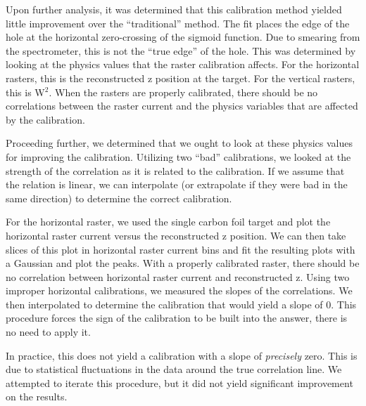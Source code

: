 Upon further analysis, it was determined that this calibration method yielded little improvement over the ``traditional'' method. The fit places the edge of the hole at the horizontal zero-crossing of the sigmoid function. Due to smearing from the spectrometer, this is not the ``true edge'' of the hole. This was determined by looking at the physics values that the raster calibration affects. For the horizontal rasters, this is the reconstructed z position at the target. For the vertical rasters, this is W$^2$. When the rasters are properly calibrated, there should be no correlations between the raster current and the physics variables that are affected by the calibration.

Proceeding further, we determined that we ought to look at these physics values for improving the calibration. Utilizing two ``bad'' calibrations, we looked at the strength of the correlation as it is related to the calibration. If we assume that the relation is linear, we can interpolate (or extrapolate if they were bad in the same direction) to determine the correct calibration.\cite{Rey}

For the horizontal raster, we used the single carbon foil target and plot the horizontal raster current versus the reconstructed z position. We can then take slices of this plot in horizontal raster current bins and fit the resulting plots with a Gaussian and plot the peaks. With a properly calibrated raster, there should be no correlation between horizontal raster current and reconstructed z. Using two improper horizontal calibrations, we measured the slopes of the correlations. We then interpolated to determine the calibration that would yield a slope of 0. This procedure forces the sign of the calibration to be built into the answer, there is no need to apply it.

In practice, this does not yield a calibration with a slope of \textit{precisely} zero. This is due to statistical fluctuations in the data around the true correlation line. We attempted to iterate this procedure, but it did not yield significant improvement on the results.

